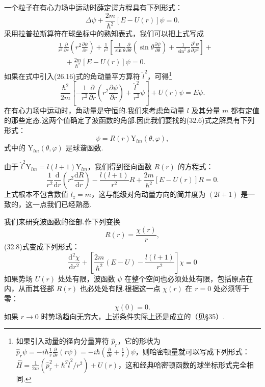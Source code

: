 一个粒子在有心力场中运动时薛定谔方程具有下列形式：
\begin{equation}
  \Delta\psi+\frac{2m}{\hbar^2}\left[E-U(r)\right]\psi=0.
\end{equation}
采用拉普拉斯算符在球坐标中的熟知表式，我们可以把上式写成
\begin{equation}
\begin{aligned}
  &\frac{1}{r^2}\frac{\partial}{\partial r}\left(r^2\frac{\partial\psi}{\partial r}\right)
  +\frac{1}{r^2}\left[\frac{1}{\sin\theta}\frac{\partial}{\partial\theta}
  \left(\sin\theta\frac{\partial\psi}{\partial\theta}\right)
  +\frac{1}{\sin^2\theta}\frac{\partial^2\psi}{\partial\varphi^2}\right]+\\
  &\quad+\frac{2m}{\hbar^2}\left[E-U(r)\right]\psi=0.
\end{aligned}
\end{equation}
如果在式中引入(26.16)式的角动量平方算符 $\hat{l}^2$，可得\footnote{如果引入动量的径向分量算符 $\hat{p}_r$，它的形状为 $\hat{p}_r\psi=-i\hbar\frac{1}{r}\frac{\partial}{\partial r}(r\psi)=-i\hbar\left(\frac{\partial}{\partial r}+\frac{1}{r}\right)\psi$，则哈密顿量就可以写成下列形式：$\hat{H}=\frac{1}{2m}\left(\hat{p}_r^2+\hbar^2\hat{l}^2/r^2\right)+U(r)$，这和经典哈密顿函数的球坐标形式完全相同.}
\begin{equation}
  \frac{\hbar^2}{2m}\left[-\frac{1}{r^2}\frac{\partial}{\partial r}
  \left(r^2\frac{\partial\psi}{\partial r}\right)+\frac{\hat{l}^2}{r^2}\psi\right]+U(r)\psi=E\psi.
\end{equation}
在有心力场中运动时，角动量是守恒的.我们来考虑角动量 $l$ 及其分量 $m$ 都有定值的那些定态.这两个值确定了波函数的角部.因此我们要找的(32.6)式之解具有下列形式：
\begin{equation}
  \psi=R(r)\mathrm{Y}_{lm}(\theta,\varphi),
\end{equation}
式中的 $\mathrm{Y}_{lm}(\theta,\varphi)$ 是球谐函数.

由于 $\hat{l}^2\mathrm{Y}_{lm}=l(l+1)\mathrm{Y}_{lm}$，我们得到径向函数 $R(r)$ 的方程式：
\begin{equation}
  \frac{1}{r^2}\frac{\mathrm{d}}{\mathrm{d}r}\left(r^2\frac{\mathrm{d}R}{\mathrm{d}r}\right)
  -\frac{l(l+1)}{r^2}R+\frac{2m}{\hbar^2}\left[E-U(r)\right]R=0.
\end{equation}
上式根本不包含数值 $l_z=m$，这与能级对角动量方向的简并度为 $(2l+1)$ 是一致的，这一点我们已经熟悉.

我们来研究波函数的径部.作下列变换
\begin{equation}
  R(r)=\frac{\chi(r)}{r},
\end{equation}
(32.8)式变成下列形式：
\begin{equation}
  \frac{\mathrm{d}^2\chi}{\mathrm{d}r^2}
  +\left[\frac{2m}{\hbar^2}(E-U)-\frac{l(l+1)}{r^2}\right]\chi=0
\end{equation}
如果势场 $U(r)$ 处处有限，波函数 $\psi$ 在整个空间也必须处处有限，包括原点在内，从而其径部 $R(r)$ 也必处处有限.根据这一点 $\chi(r)$ 在 $r=0$ 处必须等于零：
\begin{equation}
  \chi(0)=0.
\end{equation}
如果 $r\to0$ 时势场趋向无穷大，上述条件实际上还是成立的（见§35）.

